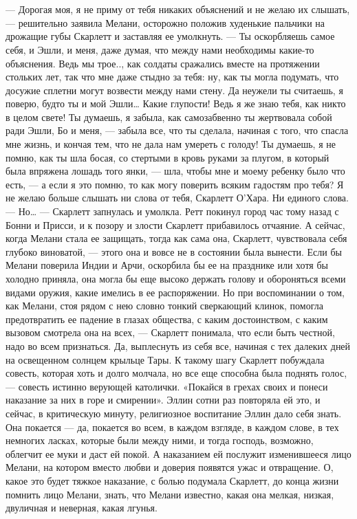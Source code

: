 \chapter{\ }

— Дорогая моя, я не приму от тебя никаких объяснений и не желаю их слышать, — решительно заявила Мелани, осторожно положив худенькие пальчики на дрожащие губы Скарлетт и заставляя ее умолкнуть. — Ты оскорбляешь самое себя, и Эшли, и меня, даже думая, что между нами необходимы какие-то объяснения. Ведь мы трое.., как солдаты сражались вместе на протяжении стольких лет, так что мне даже стыдно за тебя: ну, как ты могла подумать, что досужие сплетни могут возвести между нами стену. Да неужели ты считаешь, я поверю, будто ты и мой Эшли… Какие глупости! Ведь я же знаю тебя, как никто в целом свете! Ты думаешь, я забыла, как самозабвенно ты жертвовала собой ради Эшли, Бо и меня, — забыла все, что ты сделала, начиная с того, что спасла мне жизнь, и кончая тем, что не дала нам умереть с голоду! Ты думаешь, я не помню, как ты шла босая, со стертыми в кровь руками за плугом, в который была впряжена лошадь того янки, — шла, чтобы мне и моему ребенку было что есть, — а если я это помню, то как могу поверить всяким гадостям про тебя? Я не желаю больше слышать ни слова от тебя, Скарлетт О’Хара. Ни единого слова.
— Но… — Скарлетт запнулась и умолкла.
Ретт покинул город час тому назад с Бонни и Присси, и к позору и злости Скарлетт прибавилось отчаяние. А сейчас, когда Мелани стала ее защищать, тогда как сама она, Скарлетт, чувствовала себя глубоко виноватой, — этого она и вовсе не в состоянии была вынести. Если бы Мелани поверила Индии и Арчи, оскорбила бы ее на празднике или хотя бы холодно приняла, она могла бы еще высоко держать голову и обороняться всеми видами оружия, какие имелись в ее распоряжении. Но при воспоминании о том, как Мелани, стоя рядом с нею словно тонкий сверкающий клинок, помогла предотвратить ее падение в глазах общества, с каким достоинством, с каким вызовом смотрела она на всех, — Скарлетт понимала, что если быть честной, надо во всем признаться. Да, выплеснуть из себя все, начиная с тех далеких дней на освещенном солнцем крыльце Тары.
К такому шагу Скарлетт побуждала совесть, которая хоть и долго молчала, но все еще способна была поднять голос, — совесть истинно верующей католички. «Покайся в грехах своих и понеси наказание за них в горе и смирении». Эллин сотни раз повторяла ей это, и сейчас, в критическую минуту, религиозное воспитание Эллин дало себя знать. Она покается — да, покается во всем, в каждом взгляде, в каждом слове, в тех немногих ласках, которые были между ними, и тогда господь, возможно, облегчит ее муки и даст ей покой. А наказанием ей послужит изменившееся лицо Мелани, на котором вместо любви и доверия появятся ужас и отвращение. О, какое это будет тяжкое наказание, с болью подумала Скарлетт, до конца жизни помнить лицо Мелани, знать, что Мелани известно, какая она мелкая, низкая, двуличная и неверная, какая лгунья.
